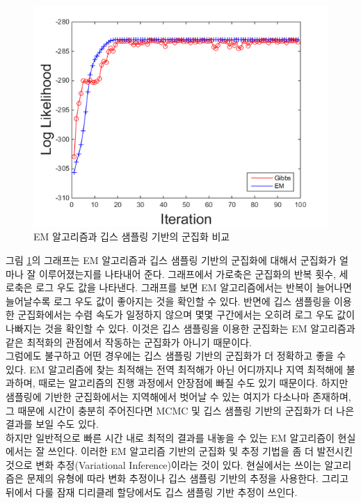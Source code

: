 \documentclass[a4paper]{oblivoir}
\begin{document}
\begin{figure}[ht] \centering 
\includegraphics[scale=0.8]{fig10_16.png} 
\caption{EM 알고리즘과 깁스 샘플링 기반의 군집화 비교}
\label{fig:10-17}
\end{figure}

그림 \ref{fig:10-17}의 그래프는 EM 알고리즘과 깁스 샘플링 기반의 군집화에 대해서 군집화가 얼마나 잘 이루어졌는지를 나타내어 준다. 그래프에서 가로축은 군집화의 반복 횟수, 세로축은 로그 우도 값을 나타낸다. 그래프를 보면 EM 알고리즘에서는 반복이 늘어나면 늘어날수록 로그 우도 값이 좋아지는 것을 확인할 수 있다. 반면에 깁스 샘플링을 이용한 군집화에서는 수렴 속도가 일정하지 않으며 몇몇 구간에서는 오히려 로그 우도 값이 나빠지는 것을 확인할 수 있다. 이것은 깁스 샘플링을 이용한 군집화는 EM 알고리즘과 같은 최적화의 관점에서 작동하는 군집화가 아니기 때문이다. \\

그럼에도 불구하고 어떤 경우에는 깁스 샘플링 기반의 군집화가 더 정확하고 좋을 수 있다. EM 알고리즘에 찾는 최적해는 전역 최적해가 아닌 어디까지나 지역 최적해에 불과하며, 때로는 알고리즘의 진행 과정에서 안장점에 빠질 수도 있기 때문이다. 하지만 샘플링에 기반한 군집화에서는 지역해에서 벗어날 수 있는 여지가 다소나마 존재하며, 그 때문에 시간이 충분히 주어진다면 MCMC 및 깁스 샘플링 기반의 군집화가 더 나은 결과를 보일 수도 있다. \\

하지만 일반적으로 빠른 시간 내로 최적의 결과를 내놓을 수 있는 EM 알고리즘이 현실에서는 잘 쓰인다. 이러한 EM 알고리즘 기반의 군집화 및 추정 기법을 좀 더 발전시킨 것으로 변화 추정(Variational Inference)이라는 것이 있다. 현실에서는 쓰이는 알고리즘은 문제의 유형에 따라 변화 추정이나 깁스 샘플링 기반의 추정을 사용한다. 그리고 뒤에서 다룰 잠재 디리클레 할당에서도 깁스 샘플링 기반 추정이 쓰인다. \\
\end{document}
